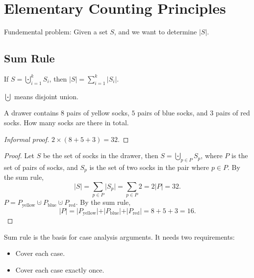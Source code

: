 \chapter{Elementary Counting Principles}
Fundemental problem: Given a set \(S\), and we want to determine \(\vert S \vert \). 
\section{Sum Rule}
\begin{theorem}
  If \(S = \bigcupdot_{i=1}^{k} S_i \), then \(\vert S \vert = \sum_{i=1}^k \vert S_i \vert\). 
\end{theorem}
\begin{note}
  \(\bigcupdot\) means disjoint union. 
\end{note}

\begin{eg}
  A drawer contains \(8\) pairs of yellow socks, \(5\) pairs of blue socks, and \(3\) pairs of red socks. How many socks are there in total.   
\end{eg}
\begin{proof}[Informal proof]
  \(2 \times (8 + 5 + 3) = 32\). 
\end{proof}
\begin{proof}
  Let \(S\) be the set of socks in the drawer, then \(S = \bigcupdot_{p \in P} S_p \), where \(P\) is the set of pairs of socks, and \(S_p\) is the set of two socks in the pair where \(p \in P\). By the sum rule, 
  \[
    \left\vert S \right\vert = \sum_{p \in P} \vert S_p \vert = \sum_{p \in P} 2  = 2 \vert P \vert = 32.
  \]   
  \(P = P_{\text{yellow}} \cupdot P_{\text{blue}} \cupdot P_{\text{red}}\). By the sum rule, 
  \[
    \vert P \vert = \vert P_{\text{yellow}} \vert + \vert P_{\text{blue}} \vert + \vert P_{\text{red}} \vert = 8 + 5 + 3 = 16.
  \] 
\end{proof}

\begin{note}
  Sum rule is the basis for case analysis arguments. It needs two requirements:
  \begin{itemize}
    \item Cover each case.
    \item Cover each case exactly once.
  \end{itemize}
\end{note}

